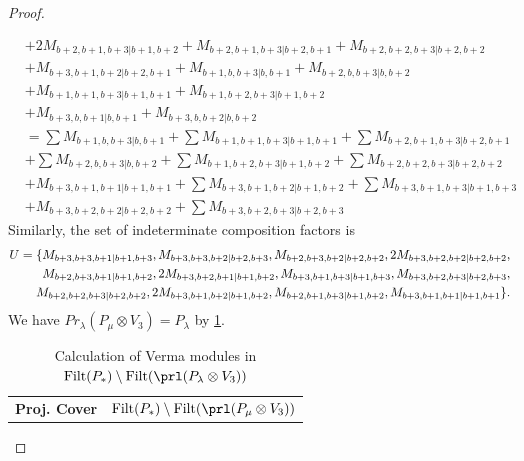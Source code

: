 \begin{proof}
\begin{enumerate}
\begin{enumerate}
\begin{equation}
\begin{aligned}
                                              &
+ 2M_{b+2,b+1,b+3|b+1,b+2}
+ M_{b+2,b+1,b+3|b+2,b+1}
+ M_{b+2,b+2,b+3|b+2,b+2}\\
                                              &
+ M_{b+3,b+1,b+2|b+2,b+1}
+ M_{b+1,b,b+3|b,b+1}
+ M_{b+2,b,b+3|b,b+2}\\
                                              &
+ M_{b+1,b+1,b+3|b+1,b+1}
+ M_{b+1,b+2,b+3|b+1,b+2}\\
                                              &
+ M_{b+3,b,b+1|b,b+1}
+ M_{b+3,b,b+2|b,b+2} \\
                                               &=
\sum M_{b+1,b,b+3|b,b+1}
+ \sum M_{b+1,b+1,b+3|b+1,b+1}
+ \sum M_{b+2,b+1,b+3|b+2,b+1}\\
                                              &
+ \sum M_{b+2,b,b+3|b,b+2}
+ \sum M_{b+1,b+2,b+3|b+1,b+2}
+ \sum M_{b+2,b+2,b+3|b+2,b+2}\\
                                              &
+  M_{b+3,b+1,b+1|b+1,b+1}
+ \sum M_{b+3,b+1,b+2|b+1,b+2}
+ \sum M_{b+3,b+1,b+3|b+1,b+3}\\
                                              &
+  M_{b+3,b+2,b+2|b+2,b+2}
+ \sum M_{b+3,b+2,b+3|b+2,b+3}
          \end{aligned}
        \end{equation}
      Similarly, the set of indeterminate composition factors is 
      \begin{equation}\notag
        \begin{aligned}
       U = \{
M_{b+3,b+3,b+1|b+1,b+3},
M_{b+3,b+3,b+2|b+2,b+3},
M_{b+2,b+3,b+2|b+2,b+2},
2M_{b+3,b+2,b+2|b+2,b+2},\\
M_{b+2,b+3,b+1|b+1,b+2},
2M_{b+3,b+2,b+1|b+1,b+2},
M_{b+3,b+1,b+3|b+1,b+3},
M_{b+3,b+2,b+3|b+2,b+3},\\
M_{b+2,b+2,b+3|b+2,b+2},
2M_{b+3,b+1,b+2|b+1,b+2},
M_{b+2,b+1,b+3|b+1,b+2},
M_{b+3,b+1,b+1|b+1,b+1}
\}.    
        \end{aligned}
      \end{equation}
      We have $Pr_{\lambda}(P_\mu \otimes V_{3}) = P_\lambda  $ by \cref{tab:verma-analysis_d_5}.
\begin{table}[htbp]
\centering
\caption{Calculation of Verma modules in $\operatorname{Filt}(P_*) \setminus \operatorname{Filt}(\prl(P_\lambda \otimes V_{3})) $ } \label{tab:verma-analysis_d_5}
\begin{tabular}{cc}
\toprule
\textbf{Proj. Cover} & \textbf{$\operatorname{Filt}(P_*) \setminus \operatorname{Filt}(\prl(P_\mu \otimes V_{3})) $}  \\

\end{tabular}
\end{table}
\end{enumerate}
\end{enumerate}
\end{proof}
